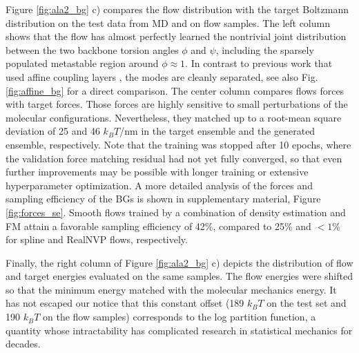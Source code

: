 \documentclass{article}
\newcommand{\TODO}[1]{{\color{orange} \textbf{TODO:} #1 }}
\begin{document}
Figure \ref{fig:ala2_bg} c) compares the flow distribution with the target Boltzmann distribution on the test data from MD and on flow samples. The left column shows that the flow has almost perfectly learned the nontrivial joint distribution between the two backbone torsion angles $\phi$ and $\psi$, including the sparsely populated metastable region around $\phi\approx 1.$ In contrast to previous work that used affine coupling layers \cite{wu2020snf}, the modes are cleanly separated, see also Fig. \ref{fig:affine_bg} for a direct comparison. 
The center column compares flows forces with target forces. Those forces are highly sensitive to small perturbations of the molecular configurations. Nevertheless, they matched up to a root-mean square deviation of 25 and 46 $k_B T$/nm in the target ensemble and the generated ensemble, respectively. Note that the training was stopped after 10 epochs, where the validation force matching residual had not yet fully converged, so that even further improvements may be possible with longer training or extensive hyperparameter optimization. 
A more detailed analysis of the forces and sampling efficiency of the BGs is shown in supplementary material, Figure \ref{fig:forces_se}. Smooth flows trained by a combination of density estimation and FM attain a favorable sampling efficiency of 42\%, compared to 25\% and $<1$\% for spline and RealNVP flows, respectively.

Finally, the right column of Figure \ref{fig:ala2_bg} c) depicts the distribution of flow and target energies evaluated on the same samples. The flow energies were shifted so that the minimum energy matched with the molecular mechanics energy. It has not escaped our notice that this constant offset (189 $k_B T$ on the test set and 190 $k_B T$ on the flow samples) corresponds to the log partition function, a quantity whose intractability has complicated research in statistical mechanics for decades. 

\end{document}
